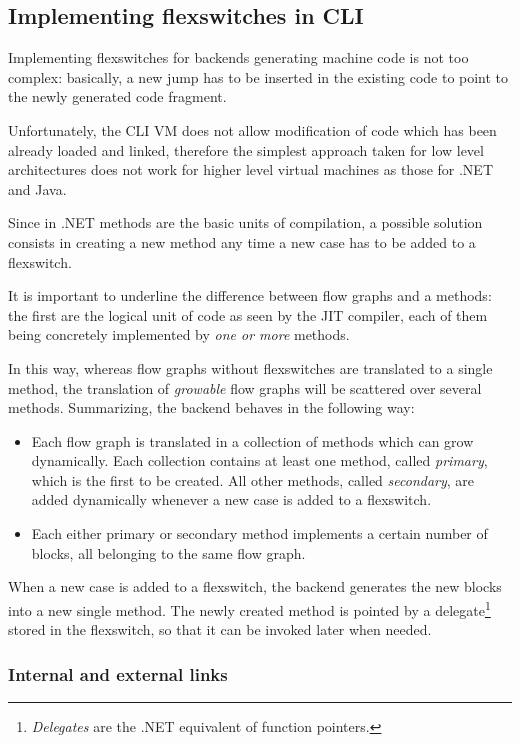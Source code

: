 \subsection{Implementing flexswitches in CLI}
\label{sec:flexswitches-cli}

Implementing flexswitches for backends generating machine code is
not too complex: basically, a new jump has to be inserted in the
existing code to point to the newly generated code fragment.

Unfortunately, the CLI VM does not allow modification of code which
has been already loaded and linked, therefore the simplest approach
taken for low level architectures does not work for higher level 
virtual machines as those for .NET and Java.

Since in .NET methods are the basic units of compilation, a possible
solution consists in creating a new method 
any time a new case has to be added to a flexswitch.

It is important to underline the difference between flow graphs and a methods:
the first are the logical unit of code as seen by the JIT compiler, each of
them being concretely implemented by \emph{one or more} methods.

In this way, whereas flow graphs without flexswitches are translated to a
single method, the translation of \emph{growable} flow graphs will be
scattered over several methods.  Summarizing, the backend behaves in the
following way:
\begin{itemize}
\item Each flow graph is translated in a collection of methods which
  can grow dynamically. Each collection contains at least one
  method, called \emph{primary}, which is the first to be created.
  All other methods, called \emph{secondary}, are added dynamically 
  whenever a new case is added to a flexswitch.

\item Each either primary or secondary method implements a certain
  number of blocks, all belonging to the same flow graph.
\end{itemize} 

When a new case is added to a flexswitch, the backend generates the new blocks
into a new single method.  The newly created method is pointed by a
delegate\footnote{\emph{Delegates} are the .NET equivalent of function
  pointers.} stored in the flexswitch, so that it can be invoked later when
needed.

\subsubsection{Internal and external links}

